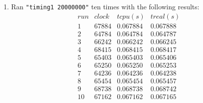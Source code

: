 \documentclass[12pt,fleqn,leqno,letterpaper]{article}
\begin{document}
\begin{enumerate}
    \item Ran \texttt{"timing1 20000000"} ten times with the following
        results:\\
        $$
        \begin{array}{lccc}
            run & clock & t cpu (s) & t real (s) \\
            1 & 67884 & 0.067884 & 0.067888 \\
            2 & 64784 & 0.064784 & 0.064787 \\
            3 & 66242 & 0.066242 & 0.066245 \\
            4 & 68415 & 0.068415 & 0.068417 \\
            5 & 65403 & 0.065403 & 0.065406 \\
            6 & 65250 & 0.065250 & 0.065253 \\
            7 & 64236 & 0.064236 & 0.064238 \\
            8 & 65454 & 0.065454 & 0.065457 \\
            9 & 68738 & 0.068738 & 0.068742 \\
            10 & 67162 & 0.067162 & 0.067165
        \end{array}
        $$
\end{enumerate}


% 
\end{document}
